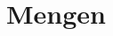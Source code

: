 \documentclass[../main.tex]{subfiles}
\begin{document}
	
	\section{Mengen}\label{section:Mengen}
	
\end{document}
